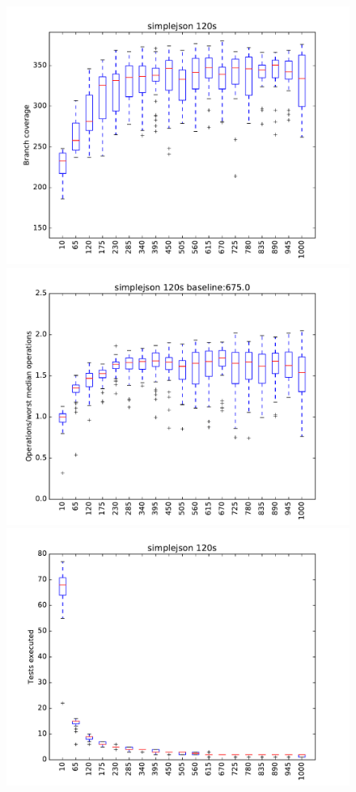 \begin{figure}
\includegraphics[width=\columnwidth]{graphs/simplejsonrand120}
\includegraphics[width=\columnwidth]{graphs/opssimplejsonrand120}
\includegraphics[width=\columnwidth]{graphs/execsimplejsonrand120}
\end{figure}

